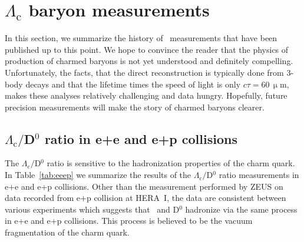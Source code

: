 \section{$\Lambda_\mathrm{c}$ baryon measurements}
In this section, we summarize the history of \Lambdac\ measurements that have been published up to this point. We hope to convince the reader that the physics of production of charmed baryons is not yet understood and definitely compelling. Unfortunately, the facts, that the direct reconstruction is typically done from 3-body decays and that the lifetime times the speed of light is only $c\tau = 60\,\upmu$m, makes these analyses relatively challenging and data hungry. Hopefully, future precision measurements will make the story of charmed baryons clearer.

\subsection{$\Lambda_\mathrm{c}/$D$^0$ ratio in e+e and e+p collisions}

The $\Lambda_\mathrm{c}/$D$^0$ ratio is sensitive to the hadronization properties of the charm quark. In Table~\ref{tab:eeep} we summarize the results of the $\Lambda_\mathrm{c}/$D$^0$ ratio measurements in e+e and e+p collisions. Other than the measurement performed by ZEUS on data recorded from e+p collision at HERA~I, the data are consistent between various experiments which suggests that \Lambdac\ and D$^0$ hadronize via the same process in e+e and e+p collisions. This process is believed to be the vacuum fragmentation of the charm quark.

